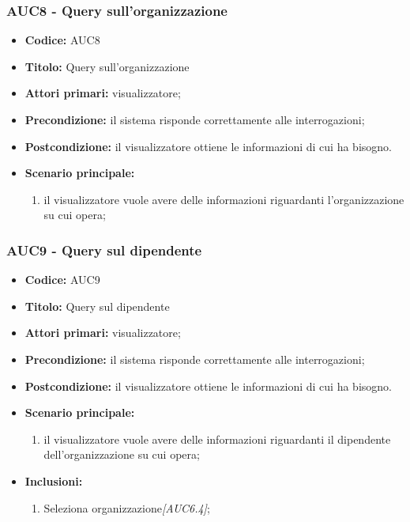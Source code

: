 \documentclass[casi-duso]{subfiles}
\begin{document}
\subsubsection{AUC8 - Query sull'organizzazione}%
\label{subsub:AUC8}
\begin{itemize}
  \item \textbf{Codice:} AUC8
  \item \textbf{Titolo:} Query sull'organizzazione
  \item \textbf{Attori primari:} visualizzatore;
  \item \textbf{Precondizione:} il sistema risponde correttamente alle interrogazioni;
  \item \textbf{Postcondizione:} il visualizzatore ottiene le informazioni di cui ha bisogno.
  \item \textbf{Scenario principale:}
  \begin{enumerate}
    \item il visualizzatore vuole avere delle informazioni riguardanti l'organizzazione su cui opera;
  \end{enumerate}
\end{itemize}

\subsubsection{AUC9 - Query sul dipendente}%
\label{subsub:AUC9}
\begin{itemize}
  \item \textbf{Codice:} AUC9
  \item \textbf{Titolo:} Query sul dipendente
  \item \textbf{Attori primari:} visualizzatore;
  \item \textbf{Precondizione:} il sistema risponde correttamente alle interrogazioni;
  \item \textbf{Postcondizione:} il visualizzatore ottiene le informazioni di cui ha bisogno.
  \item \textbf{Scenario principale:}
  \begin{enumerate}
    \item il visualizzatore vuole avere delle informazioni riguardanti il dipendente dell'organizzazione su cui opera;
  \end{enumerate}
  \item \textbf{Inclusioni:}
  \begin{enumerate}
    \item Seleziona organizzazione\emph{[AUC6.4]};
  \end{enumerate}
\end{itemize}
\end{document}
